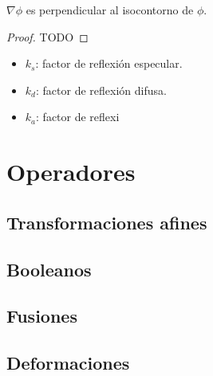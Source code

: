 \begin{proposicion}
    $\nabla\phi$ es perpendicular al isocontorno de $\phi$.
\end{proposicion}
\begin{proof}
    TODO
\end{proof}

\begin{itemize}
    \item $k_s$: factor de reflexión especular.
    \item $k_d$: factor de reflexión difusa.
    \item $k_a$: factor de reflexi
\end{itemize}
\section{Operadores}
\subsection{Transformaciones afines}
\subsection{Booleanos}
\subsection{Fusiones}
\subsection{Deformaciones}